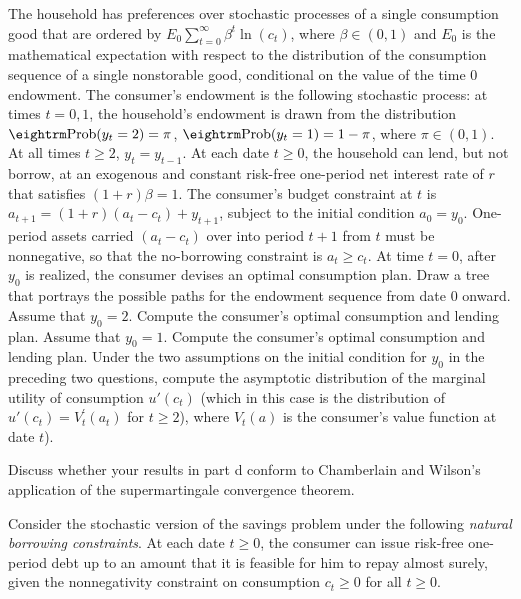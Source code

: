 \medskip

\medskip
{} \quad
The household has preferences over stochastic processes of a single consumption
good that are ordered by
$ E_0 \sum_{t=0}^\infty \beta^t \ln(c_t)$, where $\beta \in (0,1)$
and $E_0$ is the mathematical
expectation with respect to the distribution of the  consumption sequence
of a single nonstorable good, conditional
on the value of the time $0$ endowment.
 The consumer's  endowment is the following
stochastic process: at times $t=0,1$, the household's endowment is drawn
from the distribution
${\rm Prob}(y_t = 2)  = \pi$,
${\rm Prob}(y_t = 1)  =1 -  \pi$, where $\pi \in (0,1)$.  At all times
$t\geq 2$, $y_t =y_{t-1}$.
At each date $t \geq 0$, the household can  lend, but not borrow, at an
exogenous and constant risk-free one-period net interest rate of
$r$ that satisfies $(1+r)\beta =1$.
The consumer's budget constraint at $t$ is
$a_{t+1} = (1+r) (a_t -c_t) + y_{t+1}$, subject to the initial
condition $a_0 = y_0$.
One-period assets carried $(a_t -c_t)$ over into period
$t+1$ from $t$ must be nonnegative, so that the no-borrowing
constraint is $a_t \geq c_t$. At time $t=0$, after $y_0$ is realized,
the consumer devises an optimal consumption plan.
\medskip
{} Draw a tree that portrays the possible paths for
the endowment sequence from date $0$ onward.
\medskip
{}  Assume that $y_0 = 2$.  Compute the consumer's optimal
consumption and lending plan.
\medskip
{}  Assume that $y_0 =1$.  Compute the consumer's optimal
consumption and lending plan.
\medskip
{}  Under the two assumptions on the initial condition
for $y_0$ in the preceding two questions,
 compute the asymptotic distribution of the marginal
utility of consumption $u'(c_t)$ (which in this case is the distribution
of $u'(c_t) = V_t^\prime(a_t)$
for $t \geq 2$),   where $V_t(a)$ is the consumer's value function
at date $t$).

\medskip
{} Discuss whether your   results in part d conform to
Chamberlain and Wilson's application of the supermartingale convergence
theorem.

\medskip
{}  \quad
Consider the stochastic version of the savings problem
under the following {\it natural borrowing constraints\/}.   At each
date $t \geq 0$, the consumer can issue risk-free one-period debt
up to an amount   that it is feasible for him to
repay almost surely, given the nonnegativity   constraint on consumption
$c_t \geq 0$ for all $t \geq 0$.

